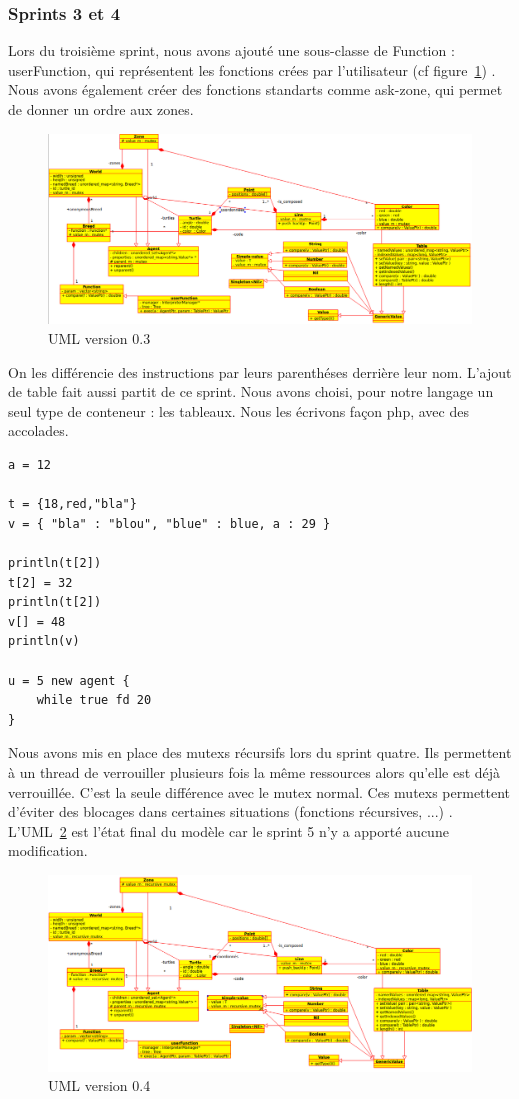 \subsubsection{Sprints 3 et 4}
Lors du troisième sprint, nous avons ajouté une sous-classe de Function : userFunction, qui représentent les fonctions crées par l'utilisateur (cf figure~\ref{v0.3}) . Nous avons également créer des fonctions standarts comme ask-zone, qui permet de donner un ordre aux zones.
\begin{figure}[h]
\includegraphics[scale=0.4]{doc/report/uml/v03.png}
\caption{\label{v0.3} UML version 0.3}
\end{figure}

On les différencie des instructions par leurs parenthéses derrière leur nom.
L'ajout de table fait aussi partit de ce sprint. Nous avons choisi, pour notre langage un seul type de conteneur : les tableaux.
Nous les écrivons façon php, avec des accolades.
\begin{lstlisting}
a = 12

t = {18,red,"bla"}
v = { "bla" : "blou", "blue" : blue, a : 29 }

println(t[2])
t[2] = 32
println(t[2])
v[] = 48
println(v)

u = 5 new agent {
	while true fd 20
}
\end{lstlisting}

Nous avons mis en place des mutexs récursifs lors du sprint quatre. Ils permettent à un thread de verrouiller plusieurs fois la même ressources alors qu'elle est déjà verrouillée. C'est la seule différence avec le mutex normal. Ces mutexs permettent d'éviter des blocages dans certaines situations (fonctions récursives, ...) .
L'UML~\ref{v0.4} est l'état final du modèle car le sprint 5 n'y a apporté aucune modification.
\begin{figure}[h]
\includegraphics[scale=0.4]{doc/report/uml/v04.png}
\caption{\label{v0.4} UML version 0.4}
\end{figure}

